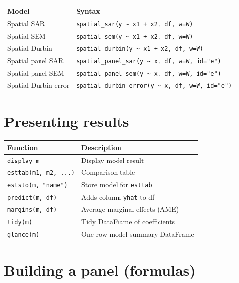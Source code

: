 \begin{center}
\begin{tabular}{ll}
\toprule
\textbf{Model} & \textbf{Syntax} \\
\midrule
Spatial SAR\textdagger{}         & \texttt{spatial\_sar(y \textasciitilde{} x1 + x2, df, w=W)} \\
Spatial SEM\textdagger{}         & \texttt{spatial\_sem(y \textasciitilde{} x1 + x2, df, w=W)} \\
Spatial Durbin\textdagger{}      & \texttt{spatial\_durbin(y \textasciitilde{} x1 + x2, df, w=W)} \\
Spatial panel SAR\textdagger{}   & \texttt{spatial\_panel\_sar(y \textasciitilde{} x, df, w=W, id="e")} \\
Spatial panel SEM\textdagger{}   & \texttt{spatial\_panel\_sem(y \textasciitilde{} x, df, w=W, id="e")} \\
Spatial Durbin error\textdagger{} & \texttt{spatial\_durbin\_error(y \textasciitilde{} x, df, w=W, id="e")} \\
\bottomrule
\end{tabular}
\end{center}

\section{Presenting results}

\begin{center}
\begin{tabular}{ll}
\toprule
\textbf{Function} & \textbf{Description} \\
\midrule
\texttt{display m}             & Display model result \\
\texttt{esttab(m1, m2, ...)}   & Comparison table \\
\texttt{eststo(m, "name")}     & Store model for \texttt{esttab} \\
\texttt{predict(m, df)}        & Adds column \texttt{yhat} to df \\
\texttt{margins(m, df)}        & Average marginal effects (AME) \\
\texttt{tidy(m)}               & Tidy DataFrame of coefficients \\
\texttt{glance(m)}              & One-row model summary DataFrame \\
\bottomrule
\end{tabular}
\end{center}

\section{Building a panel (formulas)}

